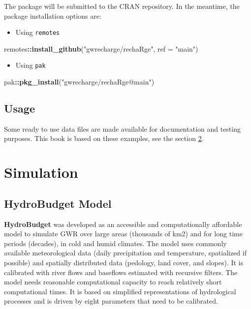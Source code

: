 \documentclass[
]{book}
\newenvironment{Shaded}{\begin{snugshade}}{\end{snugshade}}
\newcommand{\AttributeTok}[1]{\textcolor[rgb]{0.13,0.29,0.53}{#1}}
\newcommand{\FunctionTok}[1]{\textcolor[rgb]{0.13,0.29,0.53}{\textbf{#1}}}
\newcommand{\NormalTok}[1]{#1}
\newcommand{\SpecialCharTok}[1]{\textcolor[rgb]{0.81,0.36,0.00}{\textbf{#1}}}
\newcommand{\StringTok}[1]{\textcolor[rgb]{0.31,0.60,0.02}{#1}}
\providecommand{\tightlist}{%
  \setlength{\itemsep}{0pt}\setlength{\parskip}{0pt}}
\begin{document}
The package will be submitted to the CRAN repository. In the meantime, the package installation options are:

\begin{itemize}
\tightlist
\item
  Using \texttt{remotes}
\end{itemize}

\begin{Shaded}
\begin{Highlighting}[]
\NormalTok{remotes}\SpecialCharTok{::}\FunctionTok{install\_github}\NormalTok{(}\StringTok{"gwrecharge/rechaRge"}\NormalTok{, }\AttributeTok{ref =} \StringTok{"main"}\NormalTok{)}
\end{Highlighting}
\end{Shaded}

\begin{itemize}
\tightlist
\item
  Using \texttt{pak}
\end{itemize}

\begin{Shaded}
\begin{Highlighting}[]
\NormalTok{pak}\SpecialCharTok{::}\FunctionTok{pkg\_install}\NormalTok{(}\StringTok{"gwrecharge/rechaRge@main"}\NormalTok{)}
\end{Highlighting}
\end{Shaded}

\hypertarget{usage}{%
\section{Usage}\label{usage}}

Some ready to use data files are made available for documentation and testing purposes. This book is based on these examples, see the section \ref{simulation}.

\hypertarget{simulation}{%
\chapter{Simulation}\label{simulation}}

\hypertarget{hydrobudget-model}{%
\section{HydroBudget Model}\label{hydrobudget-model}}

\textbf{HydroBudget} was developed as an accessible and computationally affordable model to simulate GWR over large areas (thousands of km2) and for long time periods (decades), in cold and humid climates. The model uses commonly available meteorological data (daily precipitation and temperature, spatialized if possible) and spatially distributed data (pedology, land cover, and slopes). It is calibrated with river flows and baseflows estimated with recursive filters. The model needs reasonable computational capacity to reach relatively short computational times. It is based on simplified representations of hydrological processes and is driven by eight parameters that need to be calibrated.
\end{document}
